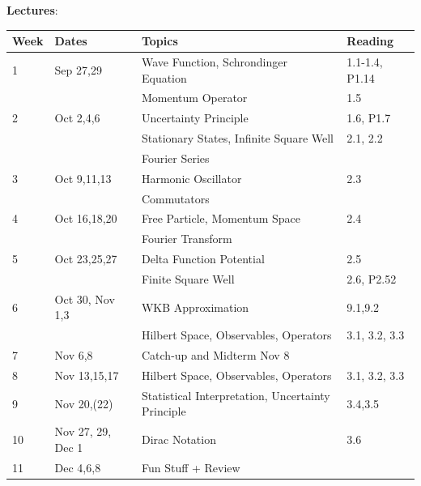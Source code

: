 \documentclass[12pt]{article}
\begin{document}
\noindent
\textbf {Lectures}:\\

\noindent
\begin{tabular}{llll}
\textbf{Week} & \textbf{Dates} & \textbf{Topics} & \textbf{Reading} \\
\hline
1  & Sep 27,29         & Wave Function, Schrondinger Equation & 1.1-1.4, P1.14 \\
   &                   & Momentum Operator  & 1.5 \\
\hline
2  & Oct 2,4,6         & Uncertainty Principle & 1.6, P1.7 \\
   &                   & Stationary States, Infinite Square Well & 2.1, 2.2 \\
   &                   & Fourier Series   & \\
\hline
3  & Oct 9,11,13       & Harmonic Oscillator & 2.3 \\
   &                   & Commutators         &   \\
\hline
4  & Oct 16,18,20      & Free Particle, Momentum Space & 2.4 \\
   &                   & Fourier Transform  &  \\
\hline
5  & Oct 23,25,27      & Delta Function Potential & 2.5 \\
   &                   & Finite Square Well & 2.6, P2.52\\
\hline
6  & Oct 30, Nov 1,3   & WKB Approximation & 9.1,9.2 \\
   &                   & Hilbert Space, Observables, Operators & 3.1, 3.2, 3.3\\
\hline
7  & Nov 6,8           & Catch-up and Midterm Nov 8 \\
\hline
8  & Nov 13,15,17      & Hilbert Space, Observables, Operators & 3.1, 3.2, 3.3\\
\hline
9  & Nov 20,(22)       & Statistical Interpretation, Uncertainty Principle & 3.4,3.5\\
\hline
10  & Nov 27, 29, Dec 1 & Dirac Notation & 3.6 \\
\hline
11 & Dec 4,6,8         & Fun Stuff + Review \\
\hline
\end{tabular}\\ \vskip 1cm
\end{document}
